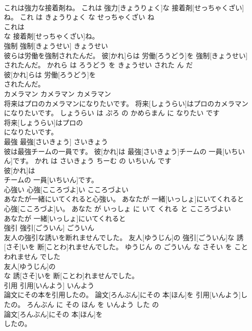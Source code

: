 \documentclass[8pt]{extreport}
\begin{document}
\begin{CJK}{UTF8}{min}
\\	これは強力な接着剤ね。	これは 強力[きょうりょく]な 接着剤[せっちゃくざい]ね。	これ は きょうりょく な せっちゃくざい ね	
\\	これは
\\	な 接着剤[せっちゃくざい]ね。			
\\	強制	強制[きょうせい]	きょうせい	
\\	彼らは労働を強制されたんだ。	彼[かれ]らは 労働[ろうどう]を 強制[きょうせい]されたんだ。	かれら は ろうどう を きょうせい された ん だ	
\\	彼[かれ]らは 労働[ろうどう]を
\\	されたんだ。			
\\	カメラマン	カメラマン	カメラマン	
\\	将来はプロのカメラマンになりたいです。	将来[しょうらい]はプロのカメラマンになりたいです。	しょうらい は ぷろ の かめらまん に なりたい です	
\\	将来[しょうらい]はプロの
\\	になりたいです。			
\\	最強	最強[さいきょう]	さいきょう	
\\	彼は最強チームの一員です。	彼[かれ]は 最強[さいきょう]チームの 一員[いちいん]です。	かれ は さいきょう ちーむ の いちいん です	
\\	彼[かれ]は
\\	チームの 一員[いちいん]です。			
\\	心強い	心強[こころづよ]い	こころづよい	
\\	あなたが一緒にいてくれると心強い。	あなたが 一緒[いっしょ]にいてくれると 心強[こころづよ]い。	あなた が いっしょ に いて くれる と こころづよい	
\\	あなたが 一緒[いっしょ]にいてくれると
\\	強引	強引[ごういん]	ごういん	
\\	友人の強引な誘いを断れませんでした。	友人[ゆうじん]の 強引[ごういん]な 誘[さそ]いを 断[ことわ]れませんでした。	ゆうじん の ごういん な さそい を ことわれません でした	
\\	友人[ゆうじん]の
\\	な 誘[さそ]いを 断[ことわ]れませんでした。			
\\	引用	引用[いんよう]	いんよう	
\\	論文にその本を引用したの。	論文[ろんぶん]にその 本[ほん]を 引用[いんよう]したの。	ろんぶん に その ほん を いんよう した の	
\\	論文[ろんぶん]にその 本[ほん]を
\\	したの。			

\end{CJK}
\end{document}
